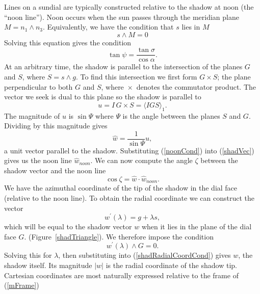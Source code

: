 \documentclass[12pt]{article}
\newcommand{\dt}{\! \cdot \!}
\newcommand{\wdg}{\! \wedge \!}
\newcommand{\crs}{\! \times \!}
\newcommand{\la}{\langle}
\newcommand{\ra}{\rangle}
\newcommand{\what}{\hat{w}}
\begin{document}
Lines on a sundial are typically constructed relative to the shadow at noon (the ``noon line''). Noon occurs when the sun passes through the meridian plane $M=n_1 \wdg n_3$. 
Equivalently, we have the condition that $s$ lies in $M$
%
\begin{equation}
s \wdg M = 0
\end{equation}
%
Solving this equation gives the condition
%
\begin{equation} \label{noonCond}
\tan\psi = \frac{ \tan\sigma }{ \cos\alpha }.
\end{equation}
%
At an arbitrary time, the shadow is parallel to the intersection of the planes $G$ and $S$, where $S = s \wdg g$. To find this intersection we first form $G \crs S$; the plane perpendicular to both $G$ and $S$, where $\crs$ denotes the commutator product. The vector we seek is dual to this plane so the shadow is parallel to
%
\begin{equation} \label{shadVec1}
u = I\, G\crs S = \la IGS \ra_1.
\end{equation}
%
The magnitude of $u$ is $\sin \Psi$ where $\Psi$ is the angle between the planes $S$ and $G$. Dividing by this magnitude gives
%
\begin{equation} \label{shadVec}
\what = \frac{1}{\sin\Psi} u,
\end{equation}
%
a unit vector parallel to the shadow. Substituting (\ref{noonCond}) into (\ref{shadVec}) gives us the noon line $\what_{noon}$. We can now compute the angle $\zeta$ between the shadow vector and the noon line
%
\begin{equation} \label{shadBearing}
\cos\zeta = \what \dt \what_{noon}.
\end{equation}
%
We have the azimuthal coordinate of the tip of the shadow in the dial face (relative to the noon line). To obtain the radial coordinate we can construct the vector
%
\begin{equation} \label{shadRadialCoordCond}
w^\prime(\lambda) = g + \lambda s,
\end{equation}
%
which will be equal to the shadow vector $w$ when it lies in the plane of the dial face $G$. (Figure~\ref{shadTriangle}). We therefore impose the condition
%
\begin{equation}
w^\prime(\lambda) \wdg G = 0.
\end{equation}
%
Solving this for $\lambda$, then substituting into (\ref{shadRadialCoordCond}) gives $w$, the shadow itself. Its magnitude $|w|$ is the radial coordinate of the shadow tip. Cartesian coordinates are most naturally expressed relative to the frame of (\ref{mFrame})
\end{document}
